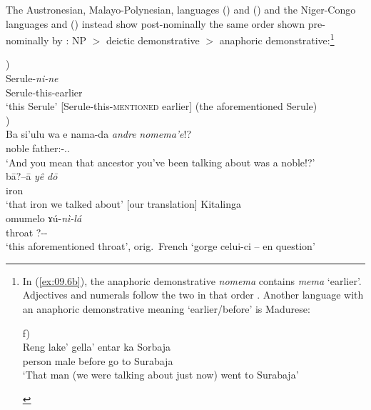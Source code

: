 \documentclass[output=paper]{langsci/langscibook}
\begin{document}
The Austronesian, Malayo-Polynesian, languages 
(\citealt{Eades2005}) and  (\citealt{Brown2005}) and the
Niger-Congo languages  \citep{Fabre2004} and
 (\citealt{Paluku1998}) instead show post-nominally
the same order shown pre-nom\-i\-nal\-ly by : NP $>$ deictic demonstrative
$>$ anaphoric demonstrative:\footnote{In (\ref{ex:09.6b}), the anaphoric
    demonstrative \emph{nomema} contains \emph{mema} ‘earlier’.  Adjectives and
    numerals follow the two  in that order
    \parencite[412]{Brown2001}.  Another language with an anaphoric
    demonstrative meaning ‘earlier/before’ is Madurese:

        \begin{exe}  \parencite[192]{Davies2010}f)\\ %
                \gll Reng   lake’ gella’ entar ka Sorbaja \\
                     person male before   go  to Surabaja \\
                \glt ‘That man (we were talking about just now) went to
            Surabaja’
        \end{exe}}

\ea\label{ex:09.6}
\ea\label{ex:09.6a} \parencite[225]{Eades2005})\\
		\gll Serule-\textit{ni-ne}\\
			    Serule-this-earlier\\
		\glt ‘this Serule’ [Serule-this-\textsc{mentioned} earlier] (the aforementioned Serule)\\
        \ex\label{ex:09.6b} \parencite[579]{Brown2005})\\
		\gll Ba  si'ulu  wa  e  nama-da  \textit{andre} \textit{nomema'e}!?\\
            \Cnj{} noble \Dptcl{} \Dptcl{} father:\Mut{}-\Fpl.\Incl.\Poss{} {\Dem{}} {\Dem{}}\\
		\glt ‘And you mean that ancestor you’ve been talking about was a noble!?’
        \ex\label{ex:09.6c} \parencite[173]{Fabre2004}\\
		\gll b\=a?–\=a \textit{yê} \textit{d\=o}\\
			    iron {\Dem{}} {\Dem{}}\\
		\glt ‘that iron we talked about’ [our translation]
    \ex\label{ex:09.6d}Kitalinga \parencite[203]{Paluku1998}\\
		\gll omumelo  ɤú-\textit{nì-lá}\\
            throat  \textsc{?}-{\Dem{}}-{\Dem{}}\\
		\glt ‘this aforementioned throat’, orig.\ French \enquote*{gorge celui-ci – en question}
	\z
\z
\end{document}
